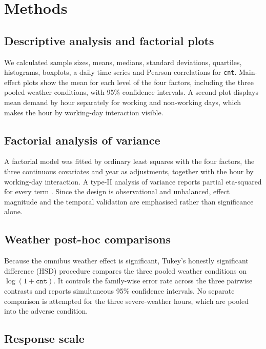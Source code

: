 \documentclass[12pt]{article}
\begin{document}
\section{Methods}

\subsection{Descriptive analysis and factorial plots}

We calculated sample sizes, means, medians, standard deviations, quartiles,
histograms, boxplots, a daily time series and Pearson correlations for
\texttt{cnt}. Main-effect plots show the mean for each level of the four factors,
including the three pooled weather conditions, with 95\% confidence intervals.
A second plot displays mean demand by hour
separately for working and non-working days, which makes the hour by
working-day interaction visible.

\subsection{Factorial analysis of variance}

A factorial model was fitted by ordinary least squares with the four factors,
the three continuous covariates and year as adjustments, together with the hour
by working-day interaction. A type-II analysis of variance reports partial
eta-squared for every term \cite{montgomery2017}. Since the design is
observational and unbalanced, effect magnitude and the temporal validation are
emphasised rather than significance alone.

\subsection{Weather post-hoc comparisons}

Because the omnibus weather effect is significant, Tukey's honestly significant
difference (HSD) procedure \cite{tukey1949} compares the three pooled weather
conditions on $\log(1+\texttt{cnt})$. It controls the family-wise error rate
across the three pairwise contrasts and reports simultaneous 95\% confidence
intervals. No separate comparison is attempted for the three severe-weather
hours, which are pooled into the adverse condition.

\subsection{Response scale}
\end{document}
